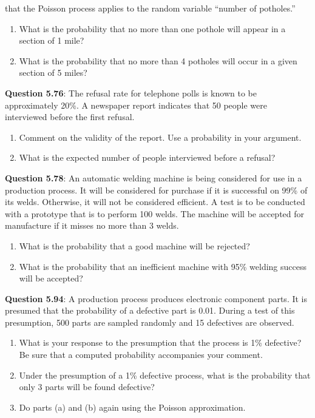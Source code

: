 \documentclass{article}
\begin{document}
    that the Poisson process applies to the random variable 
    “number of potholes.”
        \begin{enumerate}[label = (\alph*)]
            \item What is the probability that no more than one pothole 
            will appear in a section of 1 mile?
            \item What is the probability that no more than 4 potholes 
            will occur in a given section of 5 miles?
        \end{enumerate}
    \textbf{Question 5.76}: The refusal rate for telephone polls is known to
    be approximately 20\%. A newspaper report indicates
    that 50 people were interviewed before the first refusal.
        \begin{enumerate}[label = (\alph*)]
            \item Comment on the validity of the report. Use a probability 
            in your argument.
            \item What is the expected number of people interviewed
            before a refusal?
        \end{enumerate}
    \textbf{Question 5.78}: An automatic welding machine is being considered
    for use in a production process. It will be considered 
    for purchase if it is successful on 99\% of its welds. 
    Otherwise, it will not be considered efficient.
    A test is to be conducted with a prototype that is to
    perform 100 welds. The machine will be accepted for
    manufacture if it misses no more than 3 welds.
        \begin{enumerate}[label = (\alph*)]
            \item What is the probability that a good machine will
            be rejected?
            \item What is the probability that an inefficient machine
            with 95\% welding success will be accepted?
        \end{enumerate}
    \textbf{Question 5.94}: A production process produces electronic component 
    parts. It is presumed that the probability of a
    defective part is 0.01. During a test of this presumption, 
    500 parts are sampled randomly and 15 defectives
    are observed.
        \begin{enumerate}[label = (\alph*)]
            \item What is your response to the presumption that the
            process is 1\% defective? Be sure that a computed
            probability accompanies your comment.
            \item Under the presumption of a 1\% defective process,
            what is the probability that only 3 parts will be
            found defective?
            \item Do parts (a) and (b) again using the Poisson approximation.
        \end{enumerate}
\end{document}
